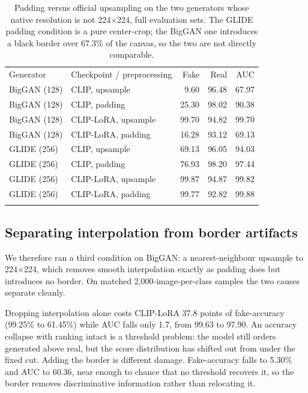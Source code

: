 \documentclass[3p,times,procedia]{elsarticle}
\begin{document}
\begin{table}[h]
\caption{Padding versus official upsampling on the two generators whose
native resolution is not 224$\times$224, full evaluation sets. The GLIDE
padding condition is a pure center-crop; the BigGAN one introduces a black
border over 67.3\% of the canvas, so the two are not directly comparable.}
\label{tab:glidepreproc}
\begin{tabular*}{\hsize}{@{\extracolsep{\fill}}llrrr@{}}
\toprule
Generator & Checkpoint / preprocessing & Fake & Real & AUC \\
\colrule
BigGAN (128) & CLIP, upsample & 9.60 & 96.48 & 67.97 \\
BigGAN (128) & CLIP, padding & 25.30 & 98.02 & 90.38 \\
BigGAN (128) & CLIP-LoRA, upsample & 99.70 & 94.82 & 99.70 \\
BigGAN (128) & CLIP-LoRA, padding & 16.28 & 93.12 & 69.13 \\
GLIDE (256) & CLIP, upsample & 69.13 & 96.05 & 94.03 \\
GLIDE (256) & CLIP, padding & 76.93 & 98.20 & 97.44 \\
GLIDE (256) & CLIP-LoRA, upsample & 99.87 & 94.87 & 99.82 \\
GLIDE (256) & CLIP-LoRA, padding & 99.77 & 92.82 & 99.88 \\
\botrule
\end{tabular*}
\end{table}

\subsection{Separating interpolation from border artifacts}
\label{sec:disentangle}

We therefore ran a third condition on BigGAN: a nearest-neighbour upsample
to 224$\times$224, which removes smooth interpolation exactly as padding
does but introduces no border. On matched 2{,}000-image-per-class samples
the two causes separate cleanly.

Dropping interpolation alone costs CLIP-LoRA 37.8 points of fake-accuracy
(99.25\% to 61.45\%) while AUC falls only 1.7, from 99.63 to 97.90. An
accuracy collapse with ranking intact is a threshold problem: the model
still orders generated above real, but the score distribution has shifted
out from under the fixed cut. Adding the border is different damage.
Fake-accuracy falls to 5.30\% and AUC to 60.36, near enough to chance that
no threshold recovers it, so the border removes discriminative information
rather than relocating it.
\end{document}
